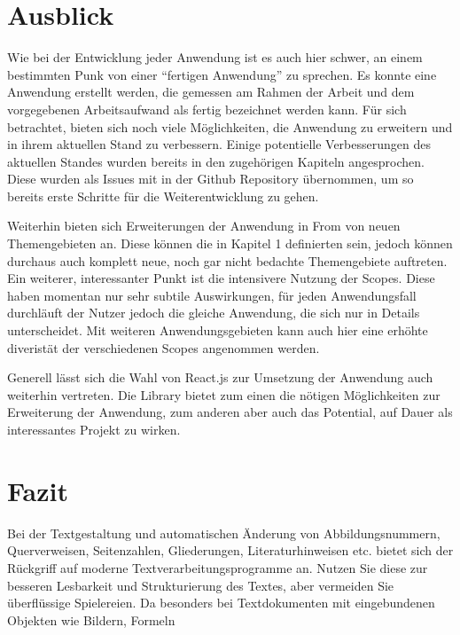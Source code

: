 \section{Ausblick}
Wie bei der Entwicklung jeder Anwendung ist es auch hier schwer, an einem bestimmten Punk von einer “fertigen Anwendung” zu sprechen. Es konnte eine Anwendung erstellt werden, die gemessen am Rahmen der Arbeit und dem vorgegebenen Arbeitsaufwand als fertig bezeichnet werden kann. Für sich betrachtet, bieten sich noch viele Möglichkeiten, die Anwendung zu erweitern und in ihrem aktuellen Stand zu verbessern.
Einige potentielle Verbesserungen des aktuellen Standes wurden bereits in den zugehörigen Kapiteln angesprochen. Diese wurden als Issues mit in der Github Repository übernommen, um so bereits erste Schritte für die Weiterentwicklung zu gehen.

Weiterhin bieten sich Erweiterungen der Anwendung in From von neuen Themengebieten an. Diese können die in Kapitel 1 definierten sein, jedoch können durchaus auch komplett neue, noch gar nicht bedachte Themengebiete auftreten.
Ein weiterer, interessanter Punkt ist die intensivere Nutzung der Scopes. Diese haben momentan nur sehr subtile Auswirkungen, für jeden Anwendungsfall durchläuft der Nutzer jedoch die gleiche Anwendung, die sich nur in Details unterscheidet. Mit weiteren Anwendungsgebieten kann auch hier eine erhöhte diveristät der verschiedenen Scopes angenommen werden.

Generell lässt sich die Wahl von React.js zur Umsetzung der Anwendung auch weiterhin vertreten. Die Library bietet zum einen die nötigen Möglichkeiten zur Erweiterung der Anwendung, zum anderen aber auch das Potential, auf Dauer als interessantes Projekt zu wirken.


\section{Fazit}
Bei der Textgestaltung und automatischen Änderung von Abbildungsnummern, Querverweisen,
Seitenzahlen, Gliederungen, Literaturhinweisen etc. bietet sich der Rückgriff
auf moderne Textverarbeitungsprogramme an. Nutzen Sie diese zur besseren Lesbarkeit
und Strukturierung des Textes, aber vermeiden Sie überflüssige Spielereien. Da
besonders bei Textdokumenten mit eingebundenen Objekten wie Bildern, Formeln
